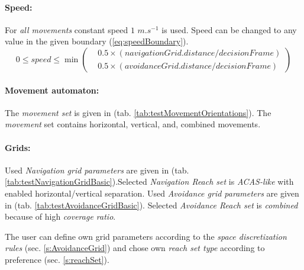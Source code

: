     \paragraph{Speed:} For \emph{all movements} constant speed $1$ $m.s^{-1}$ is used. Speed can be changed to any value in the given boundary (\ref{eq:speedBoundary}).
        \begin{equation}\label{eq:speedBoundary}
            0 \le speed    \le 
            \min\left(
            \begin{aligned}
                & 0.5\times(navigationGrid.distance/decisionFrame)\\
                & 0.5\times(avoidanceGrid.distance/decisionFrame)
            \end{aligned}
            \right)
        \end{equation}
    
    
    \paragraph{Movement automaton:} The \emph{movement set} is given in (tab. \ref{tab:testMovementOrientations}). The \emph{movement} set contains horizontal, vertical, and, combined movements. 
    
    \paragraph{Grids:} Used \emph{Navigation grid parameters} are given in (tab. \ref{tab:testNavigationGridBasic}).Selected \emph{Navigation Reach set} is \emph{ACAS-like} with enabled horizontal/vertical separation. Used \emph{Avoidance grid parameters} are given in (tab. \ref{tab:testAvoidanceGridBasic}). Selected \emph{Avoidance Reach set} is \emph{combined} because of high \emph{coverage ratio}. 
    
    The user can define own grid parameters according to the \emph{space discretization rules} (sec. \ref{s:AvoidanceGrid}) and chose own \emph{reach set type} according to preference (sec. \ref{s:reachSet}).
    
